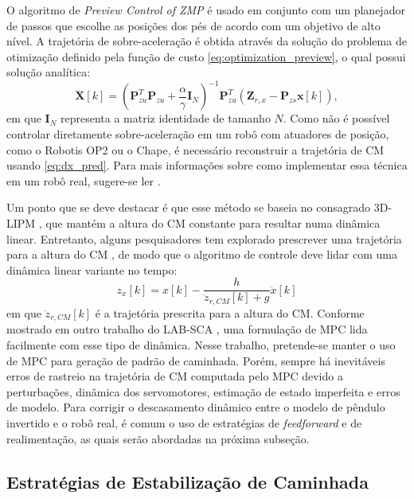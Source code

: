 O algoritmo de \emph{Preview Control of ZMP} é usado em conjunto com um planejador de passos que escolhe as posições dos pés de acordo com um objetivo de alto nível. A trajetória de sobre-aceleração é obtida através da solução do problema de otimização definido pela função de custo \eqref{eq:optimization_preview}, o qual possui solução analítica:
\begin{equation}
\dddot{\mathrm{\mathbf{X}}}[k] = \left( \mathrm{\mathbf{P}}^T_{zu} \mathrm{\mathbf{P}}_{zu} + \frac{\alpha}{\gamma} \mathrm{\mathbf{I}}_N \right)^{-1} \mathrm{\mathbf{P}}^T_{zu} \left( \mathrm{\mathbf{Z}}_{r,x} - \mathrm{\mathbf{P}}_{zs} \mathrm{\mathbf{x}}[k] \right),
\end{equation}
em que \( \mathrm{\mathbf{I}}_N \) representa a matriz identidade de tamanho \( N \). Como não é possível controlar diretamente sobre-aceleração em um robô com atuadores de posição, como o Robotis OP2 ou o Chape, é necessário reconstruir a trajetória de CM usando \eqref{eq:dx_pred}. Para mais informações sobre como implementar essa técnica em um robô real, sugere-se ler \cite{tesemarcos}.

Um ponto que se deve destacar é que esse método se baseia no consagrado 3D-LIPM \cite{kajita2001}, que mantém a altura do CM constante para resultar numa dinâmica linear. Entretanto, alguns pesquisadores tem explorado prescrever uma trajetória para a altura do CM \cite{herdt2013}, de modo que o algoritmo de controle deve lidar com uma dinâmica linear variante no tempo:
\begin{equation}
z_x\left[ k \right] = x \left[ k \right] - \frac{h}{\ddot{z}_{r,CM}\left[ k \right] + g} \ddot{x} \left[ k \right]
\end{equation}
em que \( \ddot{z}_{r,CM}[k] \) é a trajetória prescrita para a altura do CM. Conforme mostrado em outro trabalho do LAB-SCA \cite{silva2019}, uma formulação de MPC lida facilmente com esse tipo de dinâmica. Nesse trabalho, pretende-se manter o uso de MPC para geração de padrão de caminhada. Porém, sempre há inevitáveis erros de rastreio na trajetória de CM computada pelo MPC devido a perturbações, dinâmica dos servomotores, estimação de estado imperfeita e erros de modelo. Para corrigir o descasamento dinâmico entre o modelo de pêndulo invertido e o robô real, é comum o uso de estratégias de \emph{feedforward} e de realimentação, as quais serão abordadas na próxima subseção.

\subsection{Estratégias de Estabilização de Caminhada}

